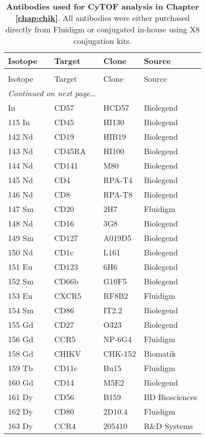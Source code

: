 \begin{flushleft}
\begin{longtable}[c]{l l l l}
    \toprule
    Isotope & Target & Clone & Source \\
    \midrule
  \endhead
    \caption[Antibodies used for CyTOF analysis in Chapter \ref{chap:chik}]{
      \textbf{Antibodies used for CyTOF analysis in Chapter \ref{chap:chik}}. All antibodies were either purchased directly from Fluidigm or conjugated in-house using X8 conjugation kits. 
    }
    \\
    \toprule
    Isotope & Target & Clone & Source \\
    \midrule
  \endfirsthead
    \midrule
    \multicolumn{2}{r}{\textit{Continued on next page\ldots}} \\
  \endfoot
    \bottomrule
  \endlastfoot
    113 In & CD57 & HCD57 & Biolegend \\
    115 In & CD45 & HI130 & Biolegend \\
    142 Nd & CD19 & HIB19 & Biolegend \\
    143 Nd & CD45RA & HI100 & Biolegend \\
    144 Nd & CD141 & M80 & Biolegend \\
    145 Nd & CD4 & RPA-T4 & Biolegend \\
    146 Nd & CD8 & RPA-T8 & Biolegend \\
    147 Sm & CD20 & 2H7 & Fluidigm \\
    148 Nd & CD16 & 3G8 & Biolegend \\
    149 Sm & CD127 & A019D5 & Biolegend \\
    150 Nd & CD1c & L161 & Biolegend \\
    151 Eu & CD123 & 6H6 & Biolegend \\
    152 Sm & CD66b & G10F5 & Biolegend \\
    153 Eu & CXCR5 & RF8B2 & Fluidigm \\
    154 Sm & CD86 & IT2.2 & Biolegend \\
    155 Gd & CD27 & O323 & Biolegend \\
    156 Gd & CCR5 & NP-6G4 & Fluidigm \\
    158 Gd & CHIKV & CHK-152 & Biomatik \\
    159 Tb & CD11c & Bu15 & Fluidigm \\
    160 Gd & CD14 & M5E2 & Biolegend \\
    161 Dy & CD56 & B159 & BD Biosciences \\
    162 Dy & CD80 & 2D10.4 & Fluidigm \\
    163 Dy & CCR4 & 205410 & R\&D Systems \\

\end{longtable}
\end{flushleft}
